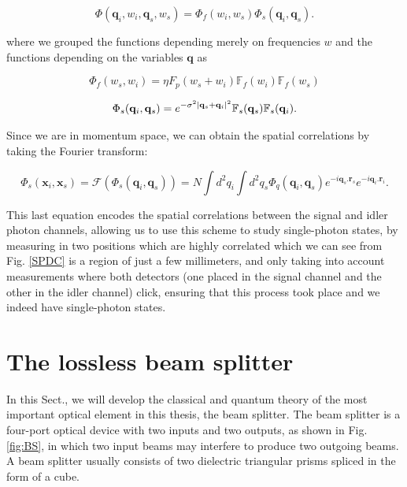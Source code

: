 \documentclass[12pt]{book}
\begin{document}
\begin{equation}
\Phi(\mathbf{q}_{i},w_{i},\mathbf{q}_{s},w_{s})=\Phi_{f}(w_{i},w_{s})\Phi_{s}(\mathbf{q}_{i},\mathbf{q}_{s}).
\end{equation}

where we grouped the functions depending merely on frequencies $w$  and the functions depending on the variables $\mathbf{q}$ as

\begin{equation}
\Phi_{f}(w_{s},w_{i})= \eta F_{p}(w_{s}+w_{i}) \mathbb{F}_{f}(w_{i})\mathbb{F}_{f}(w_{s})
\end{equation}

\begin{equation}
 \Phi_{s}(\mathbf{q}_{i},\mathbf{q}_{s})=e^{-\sigma^{2}\abs{\mathbf{q}_{s}+\mathbf{q}_{i}}^{2}}\mathbb{F}_{s}(\mathbf{q}_{s})\mathbb{F}_{s}(\mathbf{q}_{i}).
\end{equation}

Since we are in momentum space, we can obtain the spatial correlations by taking the Fourier transform:

\begin{equation}
\Phi_{s}(\mathbf{x}_{i},\mathbf{x}_{s})=\mathscr{F}(\Phi_{s}(\mathbf{q}_{i},\mathbf{q}_{s}))=N \int d^{2}q_{i} \int d^{2}q_{s} \Phi_{q}(\mathbf{q}_{i},\mathbf{q}_{s}) e^{-i \mathbf{q}_{s}.\mathbf{r}_{s}} e^{-i \mathbf{q}_{i}.\mathbf{r}_{i}}.
\end{equation}




This last equation encodes the spatial correlations between the signal and idler photon channels, allowing us to use this scheme to study single-photon states, by measuring in two positions which are highly correlated which we can see from Fig. \ref{SPDC} is a region of just a few millimeters, and only taking into account measurements where both detectors (one placed in the signal channel and the other in the idler channel) click, ensuring that this process took place and we indeed have single-photon states.


\section{The lossless beam splitter}


In this Sect., we will develop the classical and quantum theory of the most important optical element in this thesis, the beam splitter. The beam splitter is a four-port optical device with two inputs and two outputs, as shown in Fig. \ref{fig:BS}, in which two input beams may interfere to produce two outgoing beams. A beam splitter usually consists of two dielectric triangular prisms spliced in the form of a cube.
\end{document}
